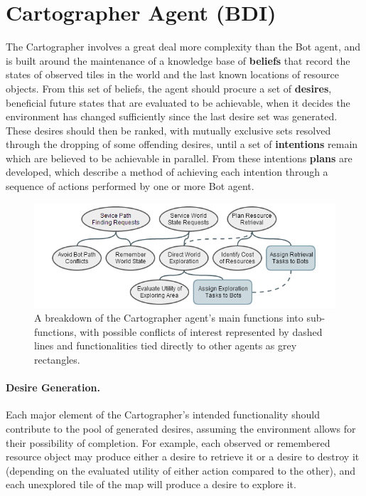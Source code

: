 \documentclass[a4paper,10pt]{article}
\begin{document}
\section{Cartographer Agent (BDI)}
The Cartographer involves a great deal more complexity than the Bot agent, and is built around the maintenance of a knowledge base of \textbf{beliefs} that record the states of observed tiles in the world and the last known locations of resource objects. From this set of beliefs, the agent should procure a set of \textbf{desires}, beneficial future states that are evaluated to be achievable, when it decides the environment has changed sufficiently since the last desire set was generated. These desires should then be ranked, with mutually exclusive sets resolved through the dropping of some offending desires, until a set of \textbf{intentions} remain which are believed to be achievable in parallel. From these intentions \textbf{plans} are developed, which describe a method of achieving each intention through a sequence of actions performed by one or more Bot agent.

\begin{figure}[ht]
  \centering
  \includegraphics[width=0.8\linewidth]{cartographer}
  \begin{minipage}[t]{0.8\textwidth}
    \caption{A breakdown of the Cartographer agent's main functions into sub-functions, with possible conflicts of interest represented by dashed lines and functionalities tied directly to other agents as grey rectangles.}
  \end{minipage}
\end{figure}

\paragraph{Desire Generation.}
Each major element of the Cartographer's intended functionality should contribute to the pool of generated desires, assuming the environment allows for their possibility of completion. For example, each observed or remembered resource object may produce either a desire to retrieve it or a desire to destroy it (depending on the evaluated utility of either action compared to the other), and each unexplored tile of the map will produce a desire to explore it.
\end{document}
